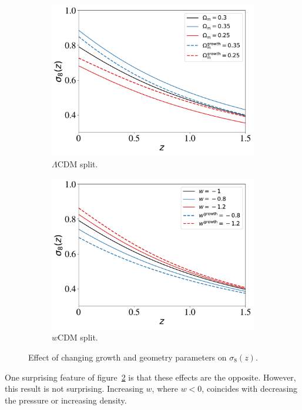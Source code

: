 \begin{figure}[ht]
	\centering
	\begin{subfigure}[b]{0.49\textwidth}
		\includegraphics[width=\textwidth]{plots/sigma8.pdf}
		\caption{$\Lambda$CDM split.}
		\label{fig:sigma8_l}
	\end{subfigure}
	\begin{subfigure}[b]{0.49\textwidth}
		\includegraphics[width=\textwidth]{plots/sigma8_w.pdf}
		\caption{$w$CDM split.}
		\label{fig:sigma8_w}
	\end{subfigure}
	\label{fig:sigma8}
	\caption{Effect of changing growth and geometry parameters on $\sigma_8(z)$.}
\end{figure}
One surprising feature of figure~\ref{fig:sigma8_w} is that these effects are the opposite. However, this result is not surprising. Increasing $w$, where $w<0$, coincides with decreasing the pressure or increasing density.
